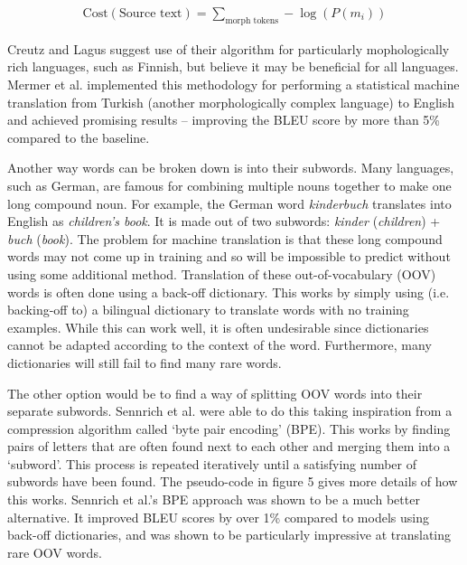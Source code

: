 \documentclass[11pt]{article}
\begin{document}
\begin{align}
    \textrm{Cost}(\textrm{Source text}) = \sum_{\textrm{morph tokens}} -\log(P(m_i))
\label{Morfessor-cost}
\end{align}

\bigskip

Creutz and Lagus suggest use of their algorithm for particularly mophologically rich languages, such as Finnish, but believe it may be beneficial for all languages. Mermer et al. \citeyearpar{mermer2010tubitak} implemented this methodology for performing a statistical machine translation from Turkish (another morphologically complex language) to English and achieved promising results -- improving the BLEU score by more than 5\% compared to the baseline.

\bigskip

Another way words can be broken down is into their subwords. Many languages, such as German, are famous for combining multiple nouns together to make one long compound noun. For example, the German word \textit{kinderbuch} translates into English as \textit{children’s book}. It is made out of two subwords: \textit{kinder} (\textit{children}) + \textit{buch} (\textit{book}). The problem for machine translation is that these long compound words may not come up in training and so will be impossible to predict without using some additional method. Translation of these out-of-vocabulary (OOV) words is often done using a back-off dictionary. This works by simply using (i.e. backing-off to) a bilingual dictionary to translate words with no training examples. While this can work well, it is often undesirable since dictionaries cannot be adapted according to the context of the word. Furthermore, many dictionaries will still fail to find many rare words.

\bigskip

The other option would be to find a way of splitting OOV words into their separate subwords. Sennrich et al. \citeyearpar{sennrich-etal-2016-neural} were able to do this taking inspiration from a compression algorithm called ‘byte pair encoding’ (BPE). This works by finding pairs of letters that are often found next to each other and merging them into a ‘subword’. This process is repeated iteratively until a satisfying number of subwords have been found. The pseudo-code in figure 5 gives more details of how this works. Sennrich et al.'s BPE approach was shown to be a much better alternative. It improved BLEU scores by over 1\% compared to models using back-off dictionaries, and was shown to be particularly impressive at translating rare OOV words.
\end{document}

